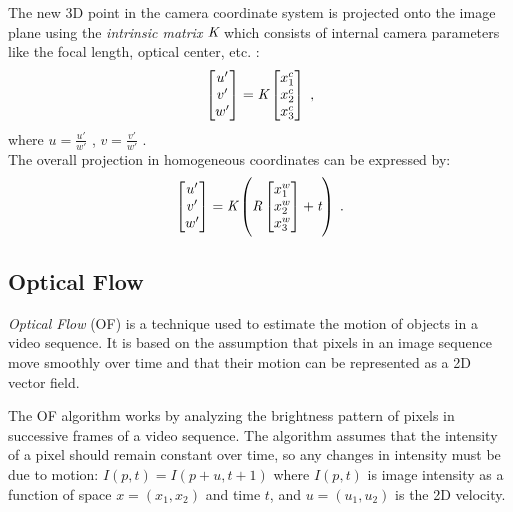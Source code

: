 \documentclass[graybox]{svmult}
\begin{document}
The new 3D point in the camera coordinate system is projected onto the image plane using the \emph{intrinsic matrix} $\emph{K}$ which consists of internal camera parameters like the focal length, optical center, etc. : 
$$
\begin{bmatrix}
		u'\\v'\\w'
		\end{bmatrix}=		
		 \emph{K}
		\begin{bmatrix}
		x_1^{c}\\x_2^{c}\\x_3^{c}
		\end{bmatrix}
    \label{eq:k1} \; ,
$$
where $u = \frac{u'}{w'}$ \;,  \; $v = \frac{v'}{w'}$ \;.\\
The overall projection in homogeneous coordinates can be expressed by:
$$ \begin{bmatrix}
		u'\\v'\\w'
		\end{bmatrix}=
		\emph{K} \left(\emph{R}
		\begin{bmatrix}
	    x_1^w\\x_2^w\\x_3^w		
	    \end{bmatrix}
		+ \emph{t} \right) \; .$$ %

\subsection{Optical Flow}
\emph{Optical Flow} (OF) is a technique used to estimate the motion of objects in a video sequence. It is based on the assumption that pixels in an image sequence move smoothly over time and that their motion can be represented as a 2D vector field.


The OF algorithm works by analyzing the brightness pattern of pixels in successive frames of a video sequence. The algorithm assumes that the intensity of a pixel should remain constant over time, so any changes in intensity must be due to motion: 
$I(p, t) = I(p + u, t + 1) $
where $I(p, t)$ is image intensity as a function of space $x = (x_1, x_2)$ and time $t$, and $u = (u_1, u_2)$ is the 2D velocity.
\end{document}
